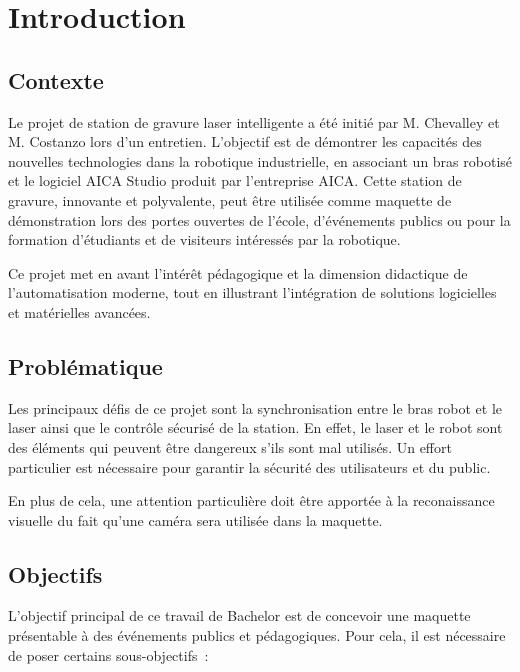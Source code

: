 \chapter{Introduction}
\label{chap:intro}


\section{Contexte}

Le projet de station de gravure laser intelligente a été initié par M. Chevalley et M. Costanzo lors d'un entretien. L'objectif est de démontrer les capacités des nouvelles technologies dans la robotique industrielle, en associant un bras robotisé et le logiciel AICA Studio produit par l'entreprise AICA. Cette station de gravure, innovante et polyvalente, peut être utilisée comme maquette de démonstration lors des portes ouvertes de l'école, d'événements publics ou pour la formation d'étudiants et de visiteurs intéressés par la robotique.

Ce projet met en avant l'intérêt pédagogique et la dimension didactique de l'automatisation moderne, tout en illustrant l'intégration de solutions logicielles et matérielles avancées.

\section{Problématique}

Les principaux défis de ce projet sont la synchronisation entre le bras robot et le laser ainsi que le contrôle sécurisé de la station. En effet, le laser et le robot sont des éléments qui peuvent être dangereux s'ils sont mal utilisés. Un effort particulier est nécessaire pour garantir la sécurité des utilisateurs et du public.

En plus de cela, une attention particulière doit être apportée à la reconaissance visuelle du fait qu'une caméra sera utilisée dans la maquette.

\section{Objectifs}

L'objectif principal de ce travail de Bachelor est de concevoir une maquette présentable à des événements publics et pédagogiques. Pour cela, il est nécessaire de poser certains sous-objectifs :

